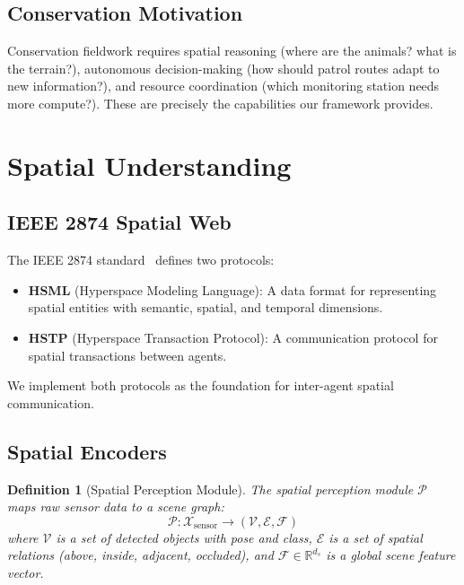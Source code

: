 \documentclass[11pt,letterpaper]{article}
\newtheorem{definition}{Definition}[section]
\newcommand{\R}{\mathbb{R}}
\begin{document}
\subsection{Conservation Motivation}

Conservation fieldwork requires spatial reasoning (where are the animals? what is the terrain?), autonomous decision-making (how should patrol routes adapt to new information?), and resource coordination (which monitoring station needs more compute?). These are precisely the capabilities our framework provides.

\section{Spatial Understanding}

\subsection{IEEE 2874 Spatial Web}

The IEEE 2874 standard~\cite{ieee2874} defines two protocols:

\begin{itemize}
    \item \textbf{HSML} (Hyperspace Modeling Language): A data format for representing spatial entities with semantic, spatial, and temporal dimensions.
    \item \textbf{HSTP} (Hyperspace Transaction Protocol): A communication protocol for spatial transactions between agents.
\end{itemize}

We implement both protocols as the foundation for inter-agent spatial communication.

\subsection{Spatial Encoders}

\begin{definition}[Spatial Perception Module]
The spatial perception module $\mathcal{P}$ maps raw sensor data to a scene graph:
\[
\mathcal{P}: \mathcal{X}_{\text{sensor}} \to (\mathcal{V}, \mathcal{E}, \mathcal{F})
\]
where $\mathcal{V}$ is a set of detected objects with pose and class, $\mathcal{E}$ is a set of spatial relations (above, inside, adjacent, occluded), and $\mathcal{F} \in \R^{d_s}$ is a global scene feature vector.
\end{definition}
\end{document}
